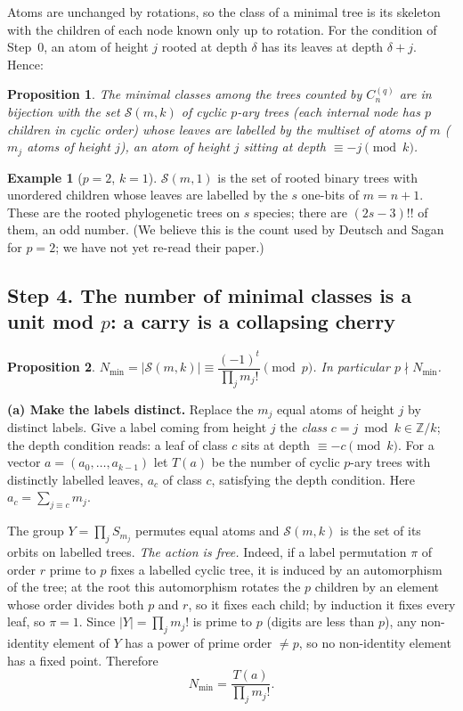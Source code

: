 \documentclass[11pt]{article}
\newtheorem{proposition}{Proposition}
\theoremstyle{definition}
\newtheorem*{example}{Example}
\newcommand{\C}[1]{C^{(q)}_{#1}}
\newcommand{\Z}{\mathbb{Z}}
\begin{document}
Atoms are unchanged by rotations, so the class of a minimal tree is its skeleton with the
children of each node known only up to rotation. For the condition of Step~0, an atom of
height $j$ rooted at depth $\delta$ has its leaves at depth $\delta+j$. Hence:

\begin{proposition}\label{prop:skeleton}
The minimal classes among the trees counted by $\C{n}$ are in bijection with the set
$\mathcal S(m,k)$ of \emph{cyclic $p$-ary trees} (each internal node has $p$ children in
cyclic order) whose leaves are labelled by the multiset of atoms of $m$ ($m_j$ atoms of
height $j$), an atom of height $j$ sitting at depth $\equiv -j \pmod k$.
\end{proposition}

\begin{example}[$p=2$, $k=1$]
$\mathcal S(m,1)$ is the set of rooted binary trees with unordered children whose leaves are
labelled by the $s$ one-bits of $m=n+1$. These are the rooted phylogenetic trees on $s$
species; there are $(2s-3)!!$ of them, an odd number. (We believe this is the count used by
Deutsch and Sagan for $p=2$; we have not yet re-read their paper.)
\end{example}

\subsection*{Step 4. The number of minimal classes is a unit mod $p$: a carry is a collapsing cherry}

\begin{proposition}\label{prop:count}
$N_{\min}=|\mathcal S(m,k)|\equiv \dfrac{(-1)^t}{\prod_j m_j!}\pmod p$. In particular
$p\nmid N_{\min}$.
\end{proposition}

\textbf{(a) Make the labels distinct.} Replace the $m_j$ equal atoms of height $j$ by
distinct labels. Give a label coming from height $j$ the \emph{class} $c=j \bmod k\in\Z/k$;
the depth condition reads: a leaf of class $c$ sits at depth $\equiv -c\pmod k$. For a vector
$a=(a_0,\dots,a_{k-1})$ let $T(a)$ be the number of cyclic $p$-ary trees with distinctly
labelled leaves, $a_c$ of class $c$, satisfying the depth condition. Here
$a_c=\sum_{j\equiv c} m_j$.

The group $Y=\prod_j S_{m_j}$ permutes equal atoms and $\mathcal S(m,k)$ is the set of its
orbits on labelled trees. \emph{The action is free.} Indeed, if a label permutation $\pi$ of
order $r$ prime to $p$ fixes a labelled cyclic tree, it is induced by an automorphism of the
tree; at the root this automorphism rotates the $p$ children by an element whose order
divides both $p$ and $r$, so it fixes each child; by induction it fixes every leaf, so
$\pi=1$. Since $|Y|=\prod_j m_j!$ is prime to $p$ (digits are less than $p$), any
non-identity element of $Y$ has a power of prime order $\ne p$, so no non-identity element
has a fixed point. Therefore
\[
  N_{\min}=\frac{T(a)}{\prod_j m_j!}.
\]
\end{document}
